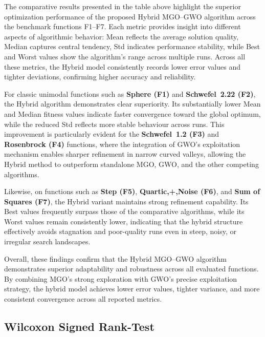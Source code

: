 \documentclass[12pt,a4paper]{article}
\begin{document}
The comparative results presented in the table above highlight the superior optimization performance of the proposed Hybrid MGO–GWO algorithm across the benchmark functions F1–F7. Each metric provides insight into different aspects of algorithmic behavior: Mean reflects the average solution quality, Median captures central tendency, Std indicates performance stability, while Best and Worst values show the algorithm’s range across multiple runs. Across all these metrics, the Hybrid model consistently records lower error values and tighter deviations, confirming higher accuracy and reliability.

For classic unimodal functions such as \textbf{Sphere (F1)} and \textbf{Schwefel~2.22 (F2)}, the Hybrid algorithm demonstrates clear superiority. Its substantially lower Mean and Median fitness values indicate faster convergence toward the global optimum, while the reduced Std reflects more stable behaviour across runs. This improvement is particularly evident for the \textbf{Schwefel~1.2 (F3)} and \textbf{Rosenbrock (F4)} functions, where the integration of GWO’s exploitation mechanism enables sharper refinement in narrow curved valleys, allowing the Hybrid method to outperform standalone MGO, GWO, and the other competing algorithms.

Likewise, on functions such as \textbf{Step (F5)}, \textbf{Quartic,{+},Noise (F6)}, and \textbf{Sum of Squares (F7)}, the Hybrid variant maintains strong refinement capability. Its Best values frequently surpass those of the comparative algorithms, while its Worst values remain consistently lower, indicating that the hybrid structure effectively avoids stagnation and poor-quality runs even in steep, noisy, or irregular search landscapes.

Overall, these findings confirm that the Hybrid MGO–GWO algorithm demonstrates superior adaptability and robustness across all evaluated functions. By combining MGO’s strong exploration with GWO’s precise exploitation strategy, the hybrid model achieves lower error values, tighter variance, and more consistent convergence across all reported metrics.

\subsection{Wilcoxon Signed Rank-Test}
\end{document}
